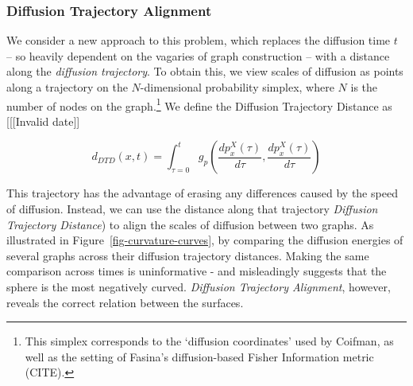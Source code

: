 \documentclass[
  letterpaper,
  DIV=11,
  numbers=noendperiod]{scrartcl}
\theoremstyle{plain}
\theoremstyle{definition}
\theoremstyle{plain}
\theoremstyle{definition}
\theoremstyle{plain}
\theoremstyle{remark}
\begin{document}
\subsubsection{Diffusion Trajectory
Alignment}\label{diffusion-trajectory-alignment}

We consider a new approach to this problem, which replaces the diffusion
time \(t\) -- so heavily dependent on the vagaries of graph construction
-- with a distance along the \emph{diffusion trajectory}. To obtain
this, we view scales of diffusion as points along a trajectory on the
\(N\)-dimensional probability simplex, where \(N\) is the number of
nodes on the graph.\footnote{This simplex corresponds to the `diffusion
  coordinates' used by Coifman, as well as the setting of Fasina's
  diffusion-based Fisher Information metric (CITE).} We define the
Diffusion Trajectory Distance as {[}{[}{[}Invalid date{]}{]}

\[
d_{DTD}(x, t)= \int_{\tau=0}^{t} g_p\left(\frac{d p_x^X(\tau)}{d \tau}, \frac{ d p_x^X(\tau) }{d \tau} \right)
\]

This trajectory has the advantage of erasing any differences caused by
the speed of diffusion. Instead, we can use the distance along that
trajectory \emph{Diffusion Trajectory Distance}) to align the scales of
diffusion between two graphs. As illustrated in
Figure~\ref{fig-curvature-curves}, by comparing the diffusion energies
of several graphs across their diffusion trajectory distances. Making
the same comparison across times is uninformative - and misleadingly
suggests that the sphere is the most negatively curved. \emph{Diffusion
Trajectory Alignment}, however, reveals the correct relation between the
surfaces.
\end{document}
